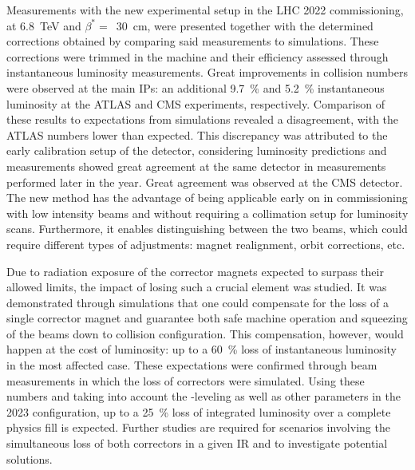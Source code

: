 Measurements with the new experimental setup in the \gls{LHC} \num{2022} commissioning, at \qty{6.8}{\tera\electronvolt} and \(\beta^{\ast} =\)~\qty{30}{\centi\meter}, were presented together with the determined corrections obtained by comparing said measurements to simulations.
These corrections were trimmed in the machine and their efficiency assessed through instantaneous \gls{luminosity} measurements.
Great improvements in collision numbers were observed at the main \glspl{IP}: an additional \qty{9.7}{\percent} and \qty{5.2}{\percent} instantaneous luminosity at the \acrshort{ATLAS} and \acrshort{CMS} \glspl{experiment}, respectively.
Comparison of these results to expectations from simulations revealed a disagreement, with the \acrshort{ATLAS} numbers lower than expected.
This discrepancy was attributed to the early calibration setup of the detector, considering luminosity predictions and measurements showed great agreement at the same detector in measurements performed later in the year.
Great agreement was observed at the \acrshort{CMS} detector.
The new method has the advantage of being applicable early on in commissioning with low intensity beams and without requiring a collimation setup for luminosity scans.
Furthermore, it enables distinguishing between the two beams, which could require different types of adjustments: magnet realignment, orbit corrections, etc.

Due to radiation exposure of the corrector magnets expected to surpass their allowed limits, the impact of losing such a crucial element was studied.
It was demonstrated through simulations that one could compensate for the loss of a single corrector magnet and guarantee both safe machine operation and squeezing of the beams down to collision configuration.
This compensation, however, would happen at the cost of luminosity: up to a \qty{60}{\percent} loss of instantaneous luminosity in the most affected case.
These expectations were confirmed through beam measurements in which the loss of correctors were simulated.
Using these numbers and taking into account the -leveling as well as other parameters in the \num{2023} configuration, up to a \qty{25}{\percent} loss of integrated luminosity over a complete physics fill is expected.
Further studies are required for scenarios involving the simultaneous loss of both correctors in a given \gls{IR} and to investigate potential solutions.

\break

